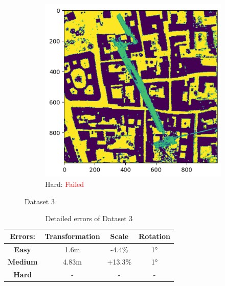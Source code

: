 \documentclass[11pt]{article}
\begin{document}
\begin{figure}[p]
        \vspace{1em}

        \begin{subfigure}{0.45\textwidth}
            \centering
            \includegraphics[width=\linewidth]{images/full/hard/5_1_2_hard}
            \caption{Hard: \textcolor{red}{Failed}}
            \label{fig:5_1_2_hard}
        \end{subfigure}
        \hfill

        \caption{Dataset 3}
        \label{fig:res_5_1_2}
    \end{figure}

    \begin{table}[p]
        \centering
        \begin{tabular}{|c|c|c|c|}
          \hline
          \textbf{Errors:} & \textbf{Transformation} & \textbf{Scale} & \textbf{Rotation} \\
          \hline
          \textbf{Easy}   & 1.6m & -4.4\%  & 1° \\
          \hline
          \textbf{Medium} & 4.83m  & +13.3\% & 1° \\
          \hline
          \textbf{Hard}   & -  & - & - \\
          \hline
        \end{tabular}
        \caption{Detailed errors of Dataset 3}
        \label{tab:simpletable}
    \end{table}
\end{document}
